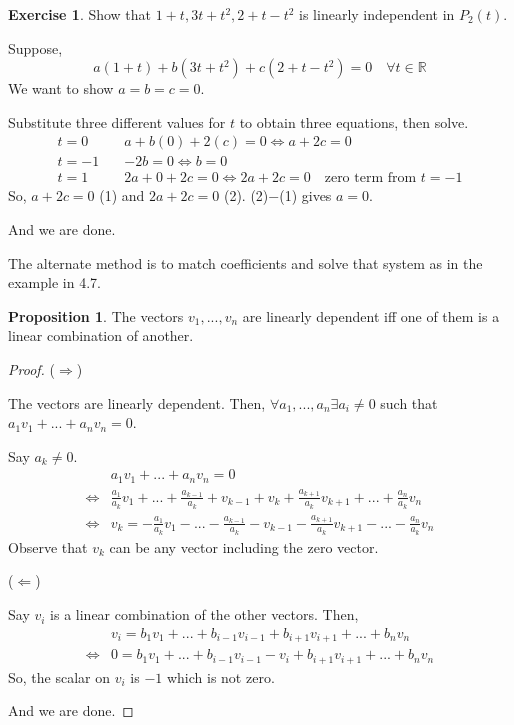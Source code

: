 \documentclass{report}
\theoremstyle{definition}
\newtheorem{_exc}{Exercise}
\newtheorem{_prop}{Proposition}
\begin{document}
\begin{_exc}
Show that ${1+t,3t+t^2,2+t-t^2}$ is linearly independent in $P_2(t)$.

Suppose,
\[a(1+t)+b(3t+t^2)+c(2+t-t^2)=0\quad \forall t\in \mathbb{R}\]
We want to show $a=b=c=0$.

Substitute three different values for $t$ to obtain three equations, then solve.
\begin{align*}
t=0\quad & a+b(0)+2(c)=0\Leftrightarrow a+2c=0\\
t=-1\quad & -2b=0\Leftrightarrow b=0\\
t=1\quad & 2a+0+2c=0\Leftrightarrow 2a+2c=0\quad \text{zero term from }t=-1
\end{align*}
So, $a+2c=0$ (1) and $2a+2c=0$ (2).
(2)$-$(1) gives $a=0$.

And we are done.

The alternate method is to match coefficients and solve that system as in the example in 4.7.
\end{_exc}

\begin{_prop}
The vectors $v_1,...,v_n$ are linearly dependent iff one of them is a linear combination of another.
\end{_prop}

\begin{proof}
($\Rightarrow$)

The vectors are linearly dependent.
Then, $\forall a_1,...,a_n \exists a_i\neq 0$ such that $a_1v_1+...+a_nv_n=0$.

Say $a_k\neq 0$.
\begin{align*}
& a_1v_1+...+a_nv_n=0 \\
\Leftrightarrow &\frac{a_1}{a_k}v_1+...+\frac{a_{k-1}}{a_k}+v_{k-1}+v_k+\frac{a_{k+1}}{a_k}v_{k+1}+...+\frac{a_n}{a_k}v_n \\
\Leftrightarrow &v_k=-\frac{a_1}{a_k}v_1-...-\frac{a_{k-1}}{a_k}-v_{k-1}-\frac{a_{k+1}}{a_k}v_{k+1}-...-\frac{a_n}{a_k}v_n
\end{align*}
Observe that $v_k$ can be any vector including the zero vector.

($\Leftarrow$)

Say $v_i$ is a linear combination of the other vectors.
Then,
\begin{align*}
& v_i=b_1v_1+...+b_{i-1}v_{i-1}+b_{i+1}v_{i+1}+...+b_nv_n \\
\Leftrightarrow & 0=b_1v_1+...+b_{i-1}v_{i-1}-v_i+b_{i+1}v_{i+1}+...+b_nv_n
\end{align*}
So, the scalar on $v_i$ is $-1$ which is not zero.

And we are done.
\end{proof}
\end{document}
